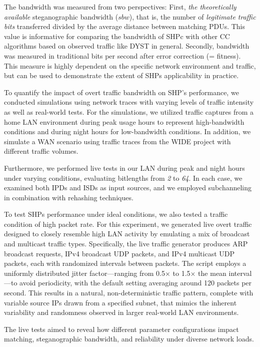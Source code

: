 \documentclass[journal]{IEEEtran}
\begin{document}
The bandwidth was measured from two perspectives: First, \emph{the theoretically available} steganographic bandwidth ($sbw$), that is, the number of \emph{legitimate traffic bits} transferred divided by the average distance between matching PDUs. This value is informative for comparing the bandwidth of \ac{SHP}c with other \ac{CC} algorithms based on observed traffic like \ac{DYST} in general. Secondly, bandwidth was measured in traditional bits per second after error correction (= fitness). This measure is highly dependent on the specific network environment and traffic, but can be used to demonstrate the extent of \ac{SHP}s applicability in practice.

To quantify the impact of overt traffic bandwidth on \ac{SHP}'s performance, we conducted simulations using network traces with varying levels of traffic intensity as well as real-world tests. For the simulations, we utilized traffic captures from a home LAN environment during peak usage hours to represent high-bandwidth conditions and during night hours for low-bandwidth conditions. In addition, we simulate a WAN scenario using traffic traces from the WIDE project with different traffic volumes.

Furthermore, we performed live tests in our \ac{LAN} during peak and night hours under varying conditions, evaluating bitlengths from \emph{2} to \emph{64}. In each case, we examined both \ac{IPD}s and \ac{ISD}s as input sources, and we employed subchanneling in combination with rehashing techniques.

To test \ac{SHP}s performance under ideal conditions, we also tested a traffic condition of high packet rate. For this experiment, we generated live overt traffic designed to closely resemble high \ac{LAN} activity by emulating a mix of broadcast and multicast traffic types. Specifically, the live traffic generator produces ARP broadcast requests, IPv4 broadcast UDP packets, and IPv4 multicast UDP packets, each with randomized intervals between packets. The script employs a uniformly distributed jitter factor—ranging from 0.5× to 1.5× the mean interval—to avoid periodicity, with the default setting averaging around 120 packets per second. This results in a natural, non-deterministic traffic pattern, complete with variable source \ac{IP}s drawn from a specified subnet, that mimics the inherent variability and randomness observed in larger real-world LAN environments.

The live tests aimed to reveal how different parameter configurations impact matching, steganographic bandwidth, and reliability under diverse network loads. 
\end{document}
